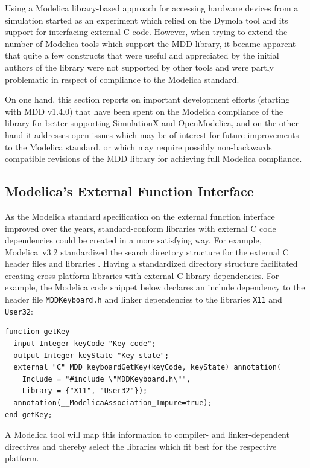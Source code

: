 \documentclass{resources/modelica}
\newcommand{\modelica}[1]{\lstinline[language=modelica]|#1|}
\begin{document}
Using a Modelica library-based approach for accessing hardware devices from a
simulation started as an experiment which relied on the Dymola tool and its
support for interfacing external C code.
However, when trying to extend the number
of Modelica tools which support the MDD library, it became apparent that quite a
few constructs that were useful and appreciated by the initial authors of the
library were not supported by other tools and were partly problematic in respect
of compliance to the Modelica standard.

On one hand, this section reports on
important development efforts (starting with MDD v1.4.0) that have been spent on the
Modelica compliance of the library for better supporting SimulationX and
OpenModelica, and on the other hand it addresses open issues which may
be of interest for future improvements to the Modelica standard, or which
may require possibly non-backwards compatible revisions of the MDD library for
achieving full Modelica compliance.

\subsection{Modelica's External Function Interface}

As the Modelica standard specification on the external function interface improved over the years,
standard-conform libraries with external C code dependencies could
be created in a more satisfying way. For example, Modelica~v3.2
standardized the search directory structure for the external C header files and
libraries \citep[p.\@~153]{ModelicaAssociation2010}.
Having a standardized directory structure facilitated creating cross-platform libraries with external C library
dependencies. For example, the Modelica code snippet below declares an
include dependency to the header file \modelica{MDDKeyboard.h} and linker dependencies to the libraries
\modelica{X11} and \modelica{User32}:
\begin{lstlisting}[language=modelica]
function getKey
  input Integer keyCode "Key code";
  output Integer keyState "Key state";
  external "C" MDD_keyboardGetKey(keyCode, keyState) annotation(
    Include = "#include \"MDDKeyboard.h\"",
    Library = {"X11", "User32"});
  annotation(__ModelicaAssociation_Impure=true);
end getKey;
\end{lstlisting}
A Modelica tool will map this information to compiler- and linker-dependent
directives and thereby select the libraries which fit best for the respective
platform.
\end{document}
